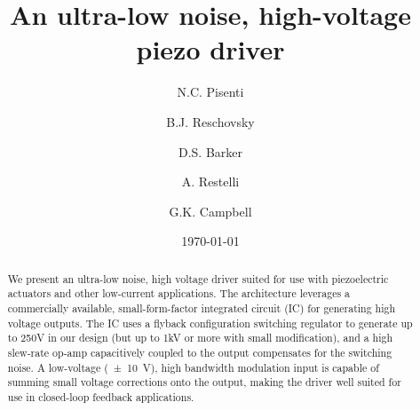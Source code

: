 \documentclass[aip,rsi,reprint]{revtex4-1} %
\begin{document}

\title{An ultra-low noise, high-voltage piezo driver}



\author{N.C. Pisenti}
\author{B.J. Reschovsky}
\author{D.S. Barker}
\author{A. Restelli}
\author{G.K. Campbell}


\date{\today}

\begin{abstract}
We present an ultra-low noise, high voltage driver suited for use with piezoelectric actuators and other low-current applications.
The architecture leverages a commercially available, small-form-factor integrated circuit (IC) for generating high voltage outputs.
The IC uses a flyback configuration switching regulator to generate up to 250V in our design (but up to 1kV or more with small modification), and a high slew-rate op-amp capacitively coupled to the output compensates for the switching noise.
A low-voltage (\SI{\pm 10}{\volt}), high bandwidth modulation input is capable of summing small voltage corrections onto the output, making the driver well suited for use in closed-loop feedback applications.
\end{abstract}

\pacs{}%

\maketitle %
\end{document}

